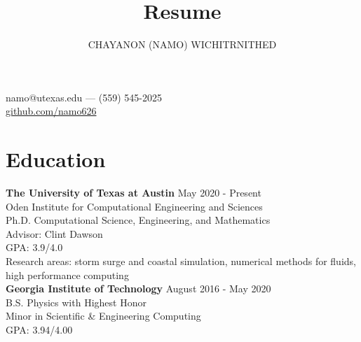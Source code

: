 \documentclass[11pt]{article}
\makeatletter
\renewcommand{\maketitle}{
  \begin{center}
    {\Large\bfseries\theauthor}

    namo@utexas.edu --- (559) 545-2025 \\
    \url{github.com/namo626}
  \end{center}
}
\newenvironment{body}{}
\makeatother
\begin{document}
\title{Resume}
\author{CHAYANON (NAMO) WICHITRNITHED}
\maketitle

\section{Education}
\begin{body}
  \textbf{The University of Texas at Austin} \hfill May 2020 - Present\\
  Oden Institute for Computational Engineering and Sciences \\
  Ph.D. Computational Science, Engineering, and Mathematics \\
  Advisor: Clint Dawson \\
  GPA: 3.9/4.0 \\
  Research areas: storm surge and coastal simulation, numerical methods for fluids, high performance computing \\

\noindent
  \textbf{Georgia Institute of Technology} \hfill August 2016 - May 2020 \\
  B.S. Physics with Highest Honor \\
  Minor in Scientific \& Engineering Computing \\
  GPA: 3.94/4.00
\end{body}
\end{document}
